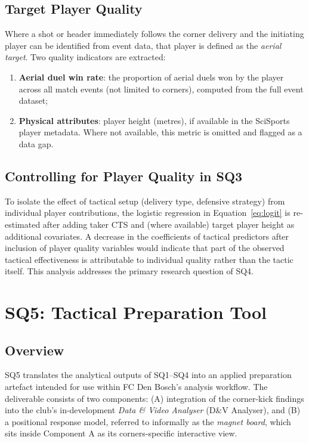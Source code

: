 \subsection{Target Player Quality}
\label{sec:sq4_target}

Where a shot or header immediately follows the corner delivery and the initiating
player can be identified from event data, that player is defined as the
\textit{aerial target}. Two quality indicators are extracted:

\begin{enumerate}
  \item \textbf{Aerial duel win rate}: the proportion of aerial duels won by the
        player across all match events (not limited to corners), computed from the
        full event dataset;
  \item \textbf{Physical attributes}: player height (metres), if available in the
        SciSports player metadata. Where not available, this metric is omitted and
        flagged as a data gap.
\end{enumerate}

\subsection{Controlling for Player Quality in SQ3}
\label{sec:sq4_control}

To isolate the effect of tactical setup (delivery type, defensive strategy) from
individual player contributions, the logistic regression in
Equation~\ref{eq:logit} is re-estimated after adding taker CTS and (where
available) target player height as additional covariates. A decrease in the
coefficients of tactical predictors after inclusion of player quality variables
would indicate that part of the observed tactical effectiveness is attributable
to individual quality rather than the tactic itself. This analysis addresses the
primary research question of SQ4.

\section{SQ5: Tactical Preparation Tool}
\label{sec:sq5}

\subsection{Overview}
\label{sec:sq5_overview}

SQ5 translates the analytical outputs of SQ1–SQ4 into an applied preparation
artefact intended for use within FC Den Bosch's analysis workflow. The
deliverable consists of two components: (A) integration of the corner-kick
findings into the club's in-development \textit{Data \& Video Analyser}
(D\&V Analyser), and (B) a positional response model, referred to
informally as the \textit{magnet board}, which sits inside Component A as
its corners-specific interactive view.

